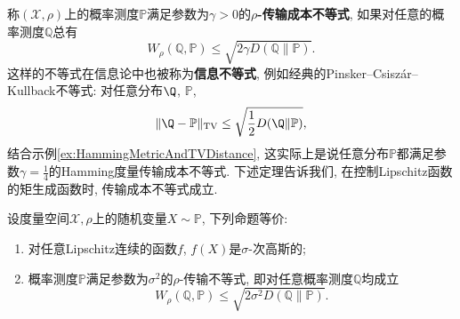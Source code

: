 称$(\mathcal{X}, \rho)$上的概率测度$\mathbb{P}$满足参数为$\gamma > 0$的\textbf{$\rho$-传输成本不等式}, 如果对任意的概率测度$\mathbb{Q}$总有
 \begin{equation}\label{eq:TransportationCostInequality}
 	W_{\rho} (\mathbb{Q}, \mathbb{P}) \leq \sqrt{2 \gamma D(\mathbb{Q} \| \mathbb{P})}.
 \end{equation}
 这样的不等式在信息论中也被称为\textbf{信息不等式}, 例如经典的Pinsker–Csiszár–Kullback不等式: 对任意分布$\Q$, $\mathbb{P}$, 
 \begin{equation}\label{eq:Pinsker–Csiszár–Kullback}
 	\|\Q - \mathbb{P}\|_{\text{TV}} \leq \sqrt{\frac{1}{2}D(\Q\|\mathbb{P})}, 
 \end{equation}
 结合示例\ref{ex:HammingMetricAndTVDistance}, 这实际上是说任意分布$\mathbb{P}$都满足参数$\gamma = \frac{1}{4}$的Hamming度量传输成本不等式. 
下述定理告诉我们, 在控制Lipschitz函数的矩生成函数时, 传输成本不等式成立. 

\begin{theorem}\label{thm:Bobkov-Götze}
	设度量空间$\mathcal{X}, \rho$上的随机变量$X \sim \mathbb{P}$, 下列命题等价: 
	\begin{enumerate}
		\item 对任意Lipschitz连续的函数$f$, $f(X)$是$\sigma$-次高斯的;
		\item 概率测度$\mathbb{P}$满足参数为$\sigma^2$的$\rho$-传输不等式, 即对任意概率测度$\mathbb{Q}$均成立
			\begin{equation*}
				W_{\rho}(\mathbb{Q}, \mathbb{P}) \leq \sqrt{2 \sigma^2 D(\mathbb{Q} \| \mathbb{P})}. 
			\end{equation*}
	\end{enumerate}
\end{theorem}

